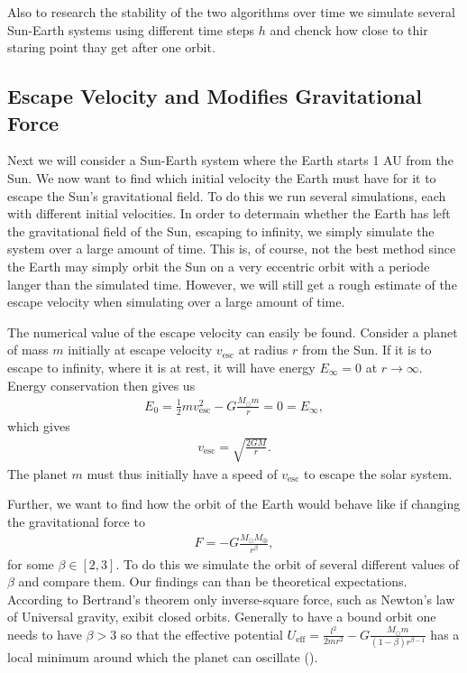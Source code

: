 \documentclass[twocolumn]{aastex62}
\begin{document}
Also to research the stability of the two algorithms over
time we simulate several Sun-Earth systems using different time steps $h$ and
chenck how close to thir staring point thay get after one orbit. 

\subsection{Escape Velocity and Modifies Gravitational Force}\label{sec:modgrav}
Next we will consider a Sun-Earth system where the Earth starts 1 AU from the
Sun. We now want to find which initial velocity the Earth must have for it to
escape the Sun's gravitational field. To do this we run several simulations,
each with different initial velocities. In order to determain whether the Earth
has left the gravitational field of the Sun, escaping to infinity, we simply
simulate the system over a large amount of time. This is, of course, not the
best method since the Earth may simply orbit the Sun on a very eccentric orbit
with a periode langer than the simulated time. However, we will still get a
rough estimate of the escape velocity when simulating over a large amount of time.

The numerical value of the escape velocity can easily be found. Consider a
planet of mass $m$ initially at escape velocity $v_\mathrm{esc}$ at radius $r$
from the Sun. If it is to escape to infinity, where it is at rest, it will have
energy $E_\infty = 0$ at $r\to\infty$. Energy conservation then gives us 
\begin{align}
    E_0 = \frac{1}{2}mv_\mathrm{esc}^2 - G\frac{M_\odot m}{r} = 0 = E_\infty,
\end{align} 
which gives 
\begin{align}\label{eq:v_esc}
    v_\mathrm{esc} = \sqrt{\frac{2GM}{r}}.
\end{align}
The planet $m$ must thus initially have a speed of $v_\mathrm{esc}$ to escape the solar system.

Further, we want to find how the orbit of the Earth would behave like if
changing the gravitational force to 
\begin{align}
    F = -G\frac{M_\odot M_\oplus}{r^\beta},
\end{align}
for some $\beta\in[2, 3]$. To do this we simulate the orbit of several different
values of $\beta$ and compare them. Our findings can than be theoretical
expectations. According to Bertrand's theorem \citep[ch. 3.6]{goldstein:2001}
only inverse-square force, such as Newton's law of Universal gravity,
exibit closed orbits. Generally to have a bound orbit one needs to have $\beta >
3$ so
that the effective potential $U_\mathrm{eff} = \frac{l^2}{2mr^2} -
G\frac{M_\odot m}{(1-\beta)r^{\beta - 1}}$ has a local minimum around which the
planet can oscillate (\cite{ray:2004}).
\end{document}
